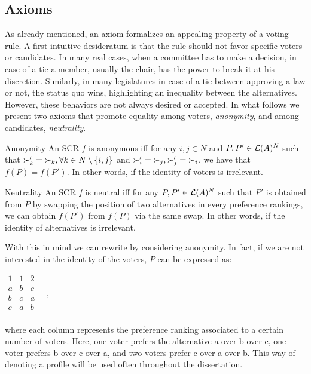 \subsection{Axioms}
As already mentioned, an axiom formalizes an appealing property of a voting rule.
A first intuitive desideratum is that the rule should not favor specific voters or candidates.
In many real cases, when a committee has to make a decision, in case of a tie a member, usually the chair, has the power to break it at his discretion.
Similarly, in many legislatures in case of a tie between approving a law or not, the status quo wins, highlighting an inequality between the alternatives.
However, these behaviors are not always desired or accepted. In what follows we present two axioms that promote equality among voters, \textit{anonymity}, and among candidates, \textit{neutrality}. 

	\begin{genthm}{Anonymity}
	An \acs{SCR} $f$ is anonymous iff for any $i,j \in N$ and $P,P'\in\mathcal{L}(A)^{N}$ such that $\mathop{\succ'_k}=\mathop{\succ_k}, \forall k \in {N \setminus\{i,j\}}$ and $\mathop{\succ'_i}=\mathop{\succ_j}, \mathop{\succ'_j}=\mathop{\succ_i}$, we have that $f(P)=f(P')$. In other words, if the identity of voters is irrelevant.
	\end{genthm}

	\begin{genthm}{Neutrality}
	An \acs{SCR} $f$ is neutral iff for any $P,P'\in\mathcal{L}(A)^{N}$ such that $P'$ is obtained from $P$ by swapping the position of two alternatives in every preference rankings, we can obtain $f(P')$ from $f(P)$ via the same swap. In other words, if the identity of alternatives is irrelevant.	
	\end{genthm}

	\begin{example}
		\label{ex:anonymousprofile}
		With this in mind we can rewrite  by considering anonymity. In fact, if we are not interested in the identity of the voters, $P$ can be expressed as:
		\begin{center}
			$
			\begin{array}{ccc}
				1 & 1 & 2 \\
				a &	b & c \\
				b &	c & a \\
				c &	a & b \\
			\end{array} \quad, 
			$
		\end{center}
		where each column represents the preference ranking associated to a certain number of voters. Here, one voter prefers the alternative a over b over c, one voter prefers b over c over a, and two voters prefer c over a over b. 
		This way of denoting a profile will be used often throughout the dissertation.
	\end{example}

